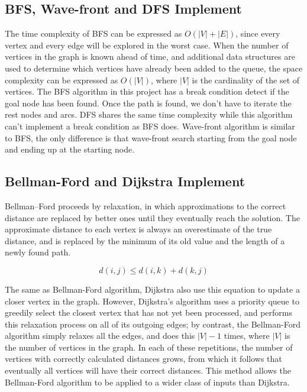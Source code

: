 \documentclass[11pt, onecolumn, letterpaper]{article}
\begin{document}
\subsection{BFS, Wave-front and DFS Implement}
The time complexity of BFS can be expressed as $O(|V|+|E|)$, since every vertex and every edge will be explored in the worst case. When the number of vertices in the graph is known ahead of time, and additional data structures are used to determine which vertices have already been added to the queue, the space complexity can be expressed as $O(|V|)$, where $|V|$ is the cardinality of the set of vertices. The BFS algorithm in this project has a break condition detect if the goal node has been found. Once the path is found, we don't have to iterate the rest nodes and arcs. DFS shares the same time complexity while this algorithm can't implement a break condition as BFS does. Wave-front algorithm is similar to BFS, the only difference is that wave-front search starting from the goal node and ending up at the starting node.

\subsection{Bellman-Ford and Dijkstra Implement}
Bellman–Ford proceeds by relaxation, in which approximations to the correct distance are replaced by better ones until they eventually reach the solution. The approximate distance to each vertex is always an overestimate of the true distance, and is replaced by the minimum of its old value and the length of a newly found path.

$$d(i,j) \leq d(i,k) + d(k,j)$$

The same as Bellman-Ford algorithm, Dijkstra also use this equation to update a closer vertex in the graph. However, Dijkstra's algorithm uses a priority queue to greedily select the closest vertex that has not yet been processed, and performs this relaxation process on all of its outgoing edges; by contrast, the Bellman-Ford algorithm simply relaxes all the edges, and does this $|V|-1$ times, where $|V|$ is the number of vertices in the graph. In each of these repetitions, the number of vertices with correctly calculated distances grows, from which it follows that eventually all vertices will have their correct distances. This method allows the Bellman-Ford algorithm to be applied to a wider class of inputs than Dijkstra.
\end{document}
